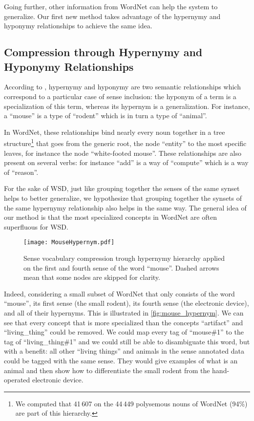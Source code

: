 \documentclass[11pt]{article}
\newcommand{\citet}[1]{\newcite{#1}}
\begin{document}
Going further, other information from WordNet can help the system to generalize. 
Our first new method takes advantage of the hypernymy and hyponymy relationships to achieve the same idea.

\subsection{Compression through Hypernymy and Hyponymy Relationships}

According to \citet{polguere2003}, hypernymy and hyponymy are two semantic relationships which correspond to a particular case of sense inclusion:
the hyponym of a term is a specialization of this term, whereas its hypernym is a generalization. For instance, a ``mouse'' is a type of ``rodent'' which is in turn a type of ``animal''.

In WordNet, these relationships bind nearly every noun together in a tree structure\footnote{We computed that 41\,607 on the 44\,449 polysemous nouns of WordNet (94\%) are part of this hierarchy.} that goes from the generic root, 
the node ``entity'' to the most specific leaves, for instance 
the node ``white-footed mouse''. These relationships are also present on several verbs: for instance ``add'' is a way of ``compute'' which 
is a way of ``reason''. 

For the sake of WSD, just like grouping together the senses of the same synset helps to better generalize, we hypothesize that grouping together the synsets of the same hypernymy relationship also helps in the same way. 
The general idea of our method is that the most specialized concepts in WordNet are often superfluous for WSD. 

\begin{figure}[htbp]
\centering
\texttt{[image: MouseHypernym.pdf]}
\caption{Sense vocabulary compression trough hypernymy hierarchy applied on the first and fourth sense of the word ``mouse''. Dashed arrows mean that some nodes are skipped for clarity.}
\label{fig:mouse_hypernym}
\end{figure}

Indeed, considering a small subset of WordNet that only consists of the word ``mouse'', its first sense (the small rodent), its fourth sense (the electronic device), and all of their hypernyms. This is illustrated in \autoref{fig:mouse_hypernym}. We can see that every concept that is more specialized than the concepts ``artifact'' and ``living\_thing'' could be removed. We could map every tag of ``mouse\#1'' to the tag of ``living\_thing\#1'' and we could still be able to disambiguate this word, but with a benefit: all other ``living things'' and animals in the sense annotated data could be tagged with the same sense. They would give examples of what is an animal and then show how to differentiate the small rodent from the hand-operated electronic device. 
\end{document}

